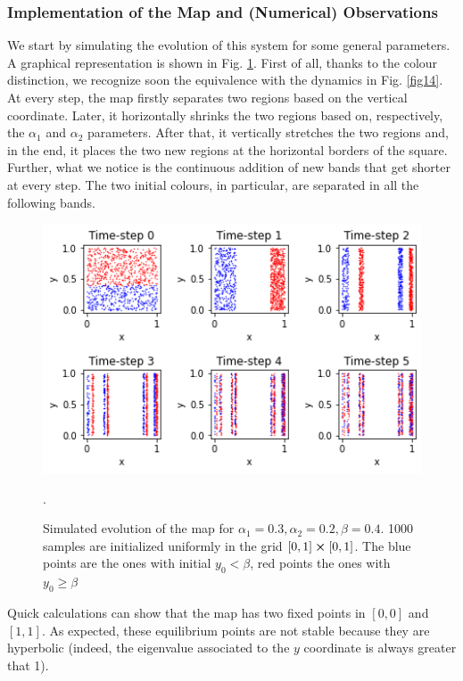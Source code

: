 \documentclass[11pt,titlepage]{article}
\begin{document}
\subsubsection{Implementation of the Map and (Numerical) Observations} \label{implementation_of_the_map_and}
We start by simulating the evolution of this system for some general parameters. A graphical representation is shown in Fig. \ref{fig15}. First of all, thanks to the colour distinction, we recognize soon the equivalence with the dynamics in Fig. \ref{fig14}. At every step, the map firstly separates two regions based on the vertical coordinate. Later, it horizontally shrinks the two regions based on, respectively, the $\alpha_1$ and $\alpha_2$ parameters. After that, it vertically stretches the two regions and, in the end, it places the two new regions at the horizontal borders of the square. Further, what we notice is the continuous addition of new bands that get shorter at every step. The two initial colours, in particular, are separated in all the following bands.
\newpage
\begin{center}
	\begin{figure} [h]
		\centering
		\includegraphics[width = 5in]{./figures/ex3_1.png}
		\caption{Simulated evolution of the map for $\alpha_1=0.3, \alpha_2=0.2, \beta=0.4$. 1000 samples are initialized uniformly in the grid $[0,1]\cross [0,1]$. The blue points are the ones with initial $y_0<\beta$, red points the ones with $y_0\ge\beta$}.
		\label{fig15}
	\end{figure}
\end{center}
Quick calculations can show that the map has two fixed points in $[0,0]$ and $[1,1]$. As expected, these equilibrium points are not stable because they are hyperbolic (indeed, the eigenvalue associated to the $y$ coordinate is always greater that 1).\\
\end{document}
